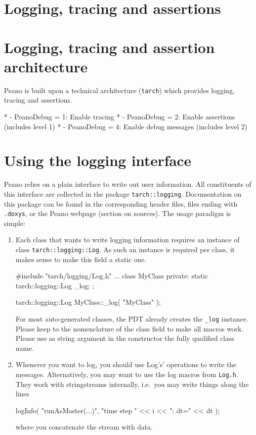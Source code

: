 \section{Logging, tracing and assertions}
\label{section:logging}


\section{Logging, tracing and assertion architecture}

Peano is built upon a technical architecture (\texttt{tarch}) which provides
logging, tracing and assertions.

 * - PeanoDebug = 1: Enable tracing
 * - PeanoDebug = 2: Enable assertions (includes level 1)
 * - PeanoDebug = 4: Enable debug messages (includes level 2)


\section{Using the logging interface}

Peano relies on a plain interface to write out user information. 
All constituents of this interface are collected in the package
\texttt{tarch::logging}.
Documentation on this package can be found in the corresponding header files,
files ending with \texttt{.doxys}, or the Peano webpage (section on sources).
The usage paradigm is simple:

\begin{enumerate}
  \item Each class that wants to write logging information requires an instance
  of class \texttt{tarch::logging::Log}. As such an instance is required per
  class, it makes sense to make this field a static one.
  \begin{code}
  #include "tarch/logging/Log.h"
  ...
  class MyClass {
    private:
      static tarch::logging::Log  _log;
  };
  
  tarch::logging::Log  MyClass::_log( "MyClass" );
  \end{code}
  For most auto-generated classes, the PDT already creates the \texttt{\_log}
  instance. Please keep to the nomenclature of the class field to make all
  macros work. Please use as string argument in the constructor the fully
  qualified class name.
  \item Whenever you want to log, you should use Log's' operations to write the
  messages. Alternatively, you may want to use the log macros from
  \texttt{Log.h}. They work with stringstreams internally, i.e.~you may write
  things along the lines
  \begin{code}
logInfo( "runAsMaster(...)", "time step " << i << ": dt=" << dt );
  \end{code}
  where you concatenate the stream with data.
\end{enumerate}

